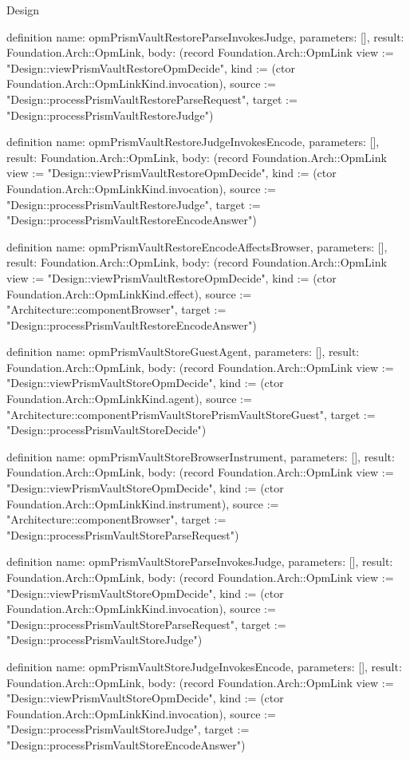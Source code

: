 \begin{lexlean}{Design}
\begin{semanticmodule}
definition{
  name: opmPrismVaultRestoreParseInvokesJudge,
  parameters: [],
  result: Foundation.Arch::OpmLink,
  body: (record Foundation.Arch::OpmLink {view := "Design::viewPrismVaultRestoreOpmDecide", kind := (ctor Foundation.Arch::OpmLinkKind.invocation), source := "Design::processPrismVaultRestoreParseRequest", target := "Design::processPrismVaultRestoreJudge"})
}

definition{
  name: opmPrismVaultRestoreJudgeInvokesEncode,
  parameters: [],
  result: Foundation.Arch::OpmLink,
  body: (record Foundation.Arch::OpmLink {view := "Design::viewPrismVaultRestoreOpmDecide", kind := (ctor Foundation.Arch::OpmLinkKind.invocation), source := "Design::processPrismVaultRestoreJudge", target := "Design::processPrismVaultRestoreEncodeAnswer"})
}

definition{
  name: opmPrismVaultRestoreEncodeAffectsBrowser,
  parameters: [],
  result: Foundation.Arch::OpmLink,
  body: (record Foundation.Arch::OpmLink {view := "Design::viewPrismVaultRestoreOpmDecide", kind := (ctor Foundation.Arch::OpmLinkKind.effect), source := "Architecture::componentBrowser", target := "Design::processPrismVaultRestoreEncodeAnswer"})
}

definition{
  name: opmPrismVaultStoreGuestAgent,
  parameters: [],
  result: Foundation.Arch::OpmLink,
  body: (record Foundation.Arch::OpmLink {view := "Design::viewPrismVaultStoreOpmDecide", kind := (ctor Foundation.Arch::OpmLinkKind.agent), source := "Architecture::componentPrismVaultStorePrismVaultStoreGuest", target := "Design::processPrismVaultStoreDecide"})
}

definition{
  name: opmPrismVaultStoreBrowserInstrument,
  parameters: [],
  result: Foundation.Arch::OpmLink,
  body: (record Foundation.Arch::OpmLink {view := "Design::viewPrismVaultStoreOpmDecide", kind := (ctor Foundation.Arch::OpmLinkKind.instrument), source := "Architecture::componentBrowser", target := "Design::processPrismVaultStoreParseRequest"})
}

definition{
  name: opmPrismVaultStoreParseInvokesJudge,
  parameters: [],
  result: Foundation.Arch::OpmLink,
  body: (record Foundation.Arch::OpmLink {view := "Design::viewPrismVaultStoreOpmDecide", kind := (ctor Foundation.Arch::OpmLinkKind.invocation), source := "Design::processPrismVaultStoreParseRequest", target := "Design::processPrismVaultStoreJudge"})
}

definition{
  name: opmPrismVaultStoreJudgeInvokesEncode,
  parameters: [],
  result: Foundation.Arch::OpmLink,
  body: (record Foundation.Arch::OpmLink {view := "Design::viewPrismVaultStoreOpmDecide", kind := (ctor Foundation.Arch::OpmLinkKind.invocation), source := "Design::processPrismVaultStoreJudge", target := "Design::processPrismVaultStoreEncodeAnswer"})
}


\end{semanticmodule}
\end{lexlean}
